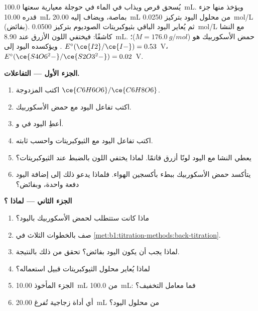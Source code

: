 \begin{problem}
\label{pb:b1:titration-methods:1}
يُسحق قرص ويذاب في الماء في حوجلة معيارية سعتها \qty{100.0}{mL}.
ويؤخذ منها جزء قدره \qty{10.00}{mL} بماصة، ويضاف إليه
\qty{20.00}{mL} من محلول اليود بتركيز \qty{0.0250}{mol/L} (بفائض). ثم
يُعاير اليود الباقي بثيوكبريتات الصوديوم بتركيز \qty{0.0500}{mol/L} مع
النشا كاشفًا: فيختفي اللون الأزرق عند \qty{8.90}{mL}.
حمض الأسكوربيك هو  ($M = \qty{176.0}{g/mol}$)؛ ويؤكسده اليود
إلى . $E^\circ(\ce{I2}/\ce{I-}) = 0.53$~V،
$E^\circ(\ce{S4O6^2-}/\ce{S2O3^2-}) = 0.02$~V.

\medskip
\noindent\textbf{الجزء الأول --- التفاعلات.}
\begin{enumerate}
  \item اكتب  المزدوجة $\ce{C6H6O6}/\ce{C6H8O6}$.
  \item اكتب تفاعل اليود مع حمض الأسكوربيك.
  \item أعطِ  اليود في  و.
  \item اكتب تفاعل اليود مع الثيوكبريتات واحسب
        ثابته.
  \item يعطي النشا مع اليود لونًا أزرق قاتمًا. لماذا يختفي اللون
        بالضبط عند   الثيوكبريتات؟
  \item يتأكسد حمض الأسكوربيك ببطء بأكسجين الهواء. فلماذا
        يدعو ذلك إلى إضافة اليود دفعة واحدة، وبفائض؟
\end{enumerate}

\medskip
\noindent\textbf{الجزء الثاني --- لماذا ؟}
\begin{enumerate}[resume]
  \item ماذا كانت ستتطلب  لحمض الأسكوربيك باليود؟
  \item صف  بالخطوات الثلاث في
        \cref{met:b1:titration-methods:back-titration}.
  \item لماذا يجب أن يكون اليود بفائض؟ تحقق من ذلك بالنتيجة.
  \item لماذا يُعاير محلول الثيوكبريتات قبيل استعماله؟
  \item الجزء المأخوذ \qty{10.00}{mL} من \qty{100.0}{mL}: فما
        معامل التخفيف؟
  \item أي أداة زجاجية تُفرغ \qty{20.00}{mL} من محلول اليود؟
\end{enumerate}


\end{problem}
